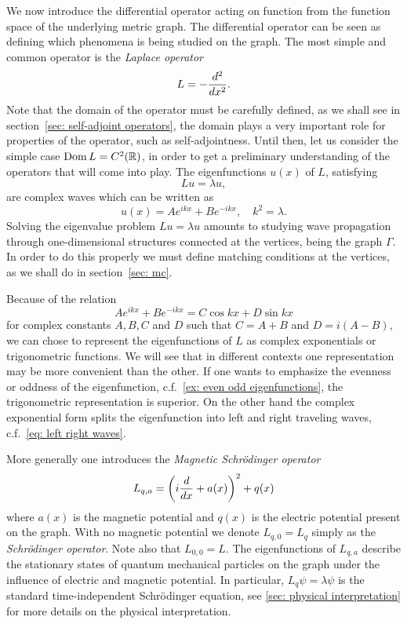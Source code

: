 We now introduce the differential operator acting on function from the function space of the underlying metric graph. The differential operator can be seen as defining which phenomena is being studied on the graph. The most simple and common operator is the \emph{Laplace operator}
\begin{equation}\label{eq: laplacian}
  L = - \frac{d^2}{dx^2}.
\end{equation}
Note that the domain of the operator must be carefully defined, as we shall see in section~\ref{sec: self-adjoint operators}, the domain plays a very important role for properties of the operator, such as self-adjointness. Until then, let us consider the simple case $\operatorname{Dom} L = C^2(\mathbb{R})$, in order to get a preliminary understanding of the operators that will come into play. The eigenfunctions $u(x)$ of $L$, satisfying
\[ Lu = \lambda u, \] are complex waves which can be written as
\[ u(x) = Ae^{ikx} + Be^{-ikx}, \quad k^2 = \lambda. \]
Solving the eigenvalue problem $Lu=\lambda u$ amounts to studying wave propagation through one-dimensional structures connected at the vertices, being the graph $\Gamma$. In order to do this properly we must define matching conditions at the vertices, as we shall do in section~\ref{sec: mc}.

Because of the relation
\[
  Ae^{ikx} + Be^{-ikx} = C\cos kx + D\sin kx
\]
for complex constants $A, B, C$ and $D$ such that $C=A+B$ and $D=i(A-B)$, we can chose to represent the eigenfunctions of $L$ as complex exponentials or trigonometric functions. We will see that in different contexts one representation may be more convenient than the other. If one wants to emphasize the evenness or oddness of the eigenfunction, c.f.~\ref{ex: even odd eigenfunctions}, the trigonometric representation is superior. On the other hand the complex exponential form splits the eigenfunction into left and right traveling waves, c.f.~\ref{eq: left right waves}.

More generally one introduces the \emph{Magnetic Schrödinger operator}
\begin{equation}\label{eq: magnetic schrödinger operator}
  L_{q,a} = \left(i\frac{d}{dx} + a(x)\right)^2 + q(x)
\end{equation}
where $a(x)$ is the magnetic potential and $q(x)$ is the electric potential present on the graph. With no magnetic potential we denote $L_{q,0} = L_q$ simply as the \emph{Schrödinger operator}. Note also that $L_{0,0} = L$. The eigenfunctions of $L_{q,a}$ describe the stationary states of quantum mechanical particles on the graph under the influence of electric and magnetic potential. In particular, $L_q \psi = \lambda \psi$ is the standard time-independent Schrödinger equation, see \cref{sec: physical interpretation} for more details on the physical interpretation.

